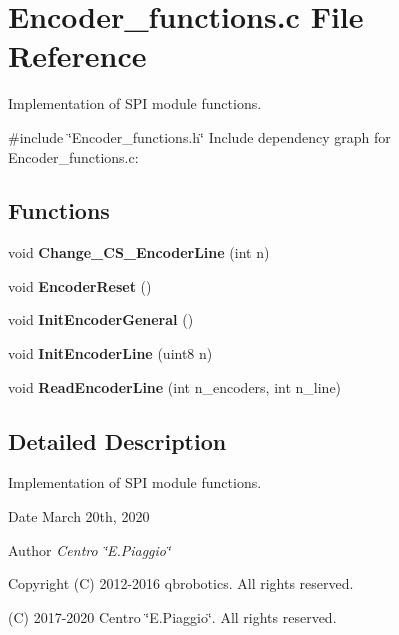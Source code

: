 \section{Encoder\+\_\+functions.\+c File Reference}
\label{_encoder__functions_8c}


Implementation of S\+PI module functions.  


{\ttfamily \#include \char`\"{}Encoder\+\_\+functions.\+h\char`\"{}}\newline
Include dependency graph for Encoder\+\_\+functions.\+c\+:
\subsection*{Functions}
\begin{DoxyCompactItemize}
\item 
\mbox{\label{_encoder__functions_8c_a22b528bf1b9a7a0a86b618d7195b106b}} 
void {\bfseries Change\+\_\+\+C\+S\+\_\+\+Encoder\+Line} (int n)
\item 
\mbox{\label{_encoder__functions_8c_a1f711fe1ef258ba1b0d90cbce8a0e645}} 
void {\bfseries Encoder\+Reset} ()
\item 
\mbox{\label{_encoder__functions_8c_a2ee4a1ed078be27aa04157f035933a2f}} 
void {\bfseries Init\+Encoder\+General} ()
\item 
\mbox{\label{_encoder__functions_8c_aa7dd2ab5bc6e906d2b1baa3dcf030197}} 
void {\bfseries Init\+Encoder\+Line} (uint8 n)
\item 
\mbox{\label{_encoder__functions_8c_af23a5b3c809698c750feda90e24f85fe}} 
void {\bfseries Read\+Encoder\+Line} (int n\+\_\+encoders, int n\+\_\+line)
\end{DoxyCompactItemize}


\subsection{Detailed Description}
Implementation of S\+PI module functions. 

\begin{DoxyDate}{Date}
March 20th, 2020 
\end{DoxyDate}
\begin{DoxyAuthor}{Author}
{\itshape Centro \char`\"{}\+E.\+Piaggio\char`\"{}} 
\end{DoxyAuthor}
\begin{DoxyCopyright}{Copyright}
(C) 2012-\/2016 qbrobotics. All rights reserved. 

(C) 2017-\/2020 Centro \char`\"{}\+E.\+Piaggio\char`\"{}. All rights reserved. 
\end{DoxyCopyright}

